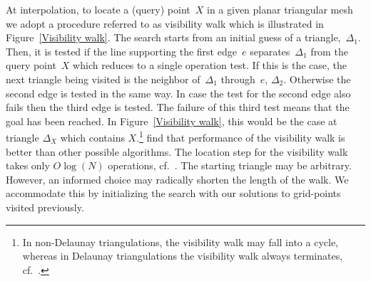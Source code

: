 \documentclass[a4paper,12pt]{article}%
\begin{document}
\begin{figure}[htb]
\begin{tabular}
\end{tabular}
\label{Delaunay Triangulation Computational}
\end{figure}

At interpolation, to locate a (query) point~$X$ in a given planar triangular mesh we adopt a procedure referred to as visibility walk which is illustrated in Figure~\ref{Visibility walk}. The search starts from an initial guess of a triangle,~$\Delta_{1}$. Then, it is tested if the line supporting the first edge~$e$ separates~$\Delta_{1}$ from the query point~$X$ which reduces to a single operation test. If this is the case, the next triangle being visited is the neighbor of~$\Delta_{1}$ through~$e$, $\Delta_{2}$. Otherwise the second edge is tested in the same way. In case the test for the second edge also fails then the third edge is tested. The failure of this third test means that the goal has been reached. In Figure~\ref{Visibility walk}, this would be the case at triangle $\Delta_{X}$ which contains $X$.\footnote{In non-Delaunay triangulations, the visibility walk may fall into a cycle, whereas in Delaunay triangulations the visibility walk always terminates, cf.~.}
 find that performance of the visibility walk is better than other possible algorithms. The location step for the visibility walk takes only $O\log\left(N\right)$ operations, cf.~. The starting triangle may be arbitrary. However, an informed choice may radically shorten the length of the walk. We accommodate this by initializing the search with our solutions to grid-points visited previously.
\end{document}

